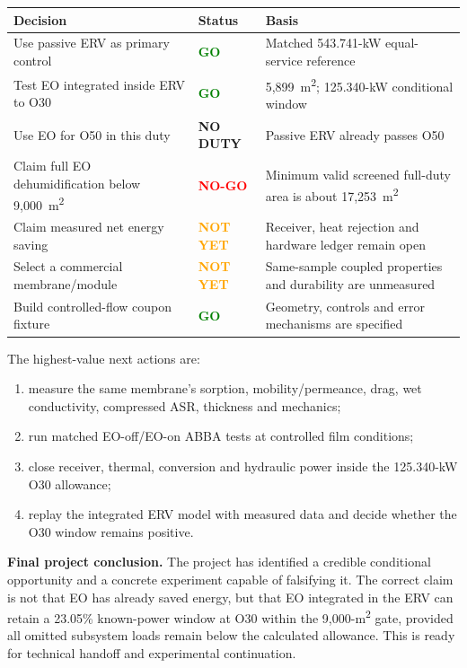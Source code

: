\documentclass[10pt,a4paper]{article}
\begin{document}
\begin{center}\small
\begin{tabularx}{\textwidth}{@{}p{54mm}p{22mm}Y@{}}
\toprule
\textbf{Decision} & \textbf{Status} & \textbf{Basis} \\
\midrule
Use passive ERV as primary control & \textcolor{Green}{\textbf{GO}} & Matched 543.741-kW equal-service reference \\
Test EO integrated inside ERV to O30 & \textcolor{Green}{\textbf{GO}} & 5,899~m\textsuperscript{2}; 125.340-kW conditional window \\
Use EO for O50 in this duty & \textcolor{Slate}{\textbf{NO DUTY}} & Passive ERV already passes O50 \\
Claim full EO dehumidification below 9,000~m\textsuperscript{2} & \textcolor{Red}{\textbf{NO-GO}} & Minimum valid screened full-duty area is about 17,253~m\textsuperscript{2} \\
Claim measured net energy saving & \textcolor{Orange}{\textbf{NOT YET}} & Receiver, heat rejection and hardware ledger remain open \\
Select a commercial membrane/module & \textcolor{Orange}{\textbf{NOT YET}} & Same-sample coupled properties and durability are unmeasured \\
Build controlled-flow coupon fixture & \textcolor{Green}{\textbf{GO}} & Geometry, controls and error mechanisms are specified \\
\bottomrule
\end{tabularx}
\end{center}

The highest-value next actions are:
\begin{enumerate}
  \item measure the same membrane's sorption, mobility/permeance, drag, wet
  conductivity, compressed ASR, thickness and mechanics;
  \item run matched EO-off/EO-on ABBA tests at controlled film conditions;
  \item close receiver, thermal, conversion and hydraulic power inside the
  125.340-kW O30 allowance;
  \item replay the integrated ERV model with measured data and decide whether
  the O30 window remains positive.
\end{enumerate}

\begin{mainbox}
\textbf{Final project conclusion.} The project has identified a credible
conditional opportunity and a concrete experiment capable of falsifying it.
The correct claim is not that EO has already saved energy, but that EO
integrated in the ERV can retain a 23.05\% known-power window at O30 within the
9,000-m\textsuperscript{2} gate, provided all omitted subsystem loads remain
below the calculated allowance. This is ready for technical handoff and
experimental continuation.
\end{mainbox}
\end{document}

